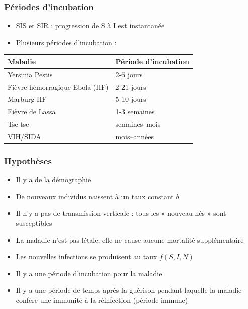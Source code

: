 \documentclass[aspectratio=169]{beamer}\usepackage[]{graphicx}\usepackage[]{xcolor}
\begin{document}
\begin{frame}
\frametitle{Périodes d'incubation}
\begin{itemize}
\item SIS et SIR : progression de S à I est instantanée
\vfill
\item Plusieurs périodes d'incubation :
\end{itemize}
\begin{center}
\begin{tabular}{l|l}
Maladie & Période d'incubation \\
\hline
Yersinia Pestis & 2-6 jours \\
Fièvre hémorragique Ebola (HF) & 2-21 jours \\
Marburg HF & 5-10 jours \\
Fièvre de Lassa & 1-3 semaines \\
Tse-tse & semaines--mois \\
VIH/SIDA & mois--années
\end{tabular}
\end{center}
\end{frame}

\begin{frame}
\frametitle{Hypothèses}
\begin{itemize}
\item Il y a de la démographie
\item De nouveaux individus naissent à un taux constant $b$
\item
Il n'y a pas de transmission verticale : tous les « nouveau-nés » sont susceptibles
\item La maladie n'est pas létale, elle ne cause aucune mortalité supplémentaire
\item Les nouvelles infections se produisent au taux $f(S,I,N)$
\item Il y a une période d'incubation pour la maladie
\item Il y a une période de temps après la guérison pendant laquelle la maladie confère une immunité à la réinfection (période immune)
\end{itemize} 
\end{frame}
\end{document}
